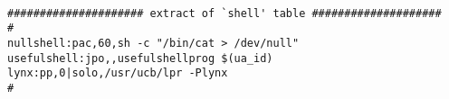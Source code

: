 \small\begin{verbatim}

##################### extract of `shell' table ####################
#
nullshell:pac,60,sh -c "/bin/cat > /dev/null"
usefulshell:jpo,,usefulshellprog $(ua_id)
lynx:pp,0|solo,/usr/ucb/lpr -Plynx
#
\end{verbatim}

